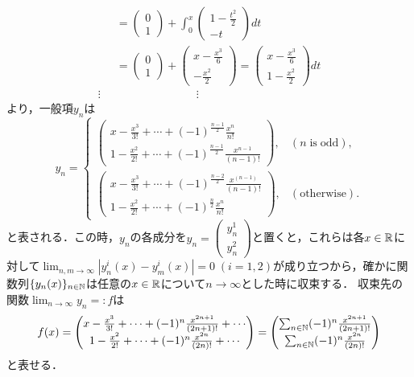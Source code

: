 \documentclass[uplatex,dvipdfmx]{jsarticle}
\begin{document}
\begin{align*}
    &= \begin{pmatrix}0\\1\end{pmatrix} + \int^x_0\begin{pmatrix}1-\frac{t^2}{2}\\-t\end{pmatrix}dt\\
    &= \begin{pmatrix}0\\1\end{pmatrix} + \begin{pmatrix}x-\frac{x^3}{6}\\-\frac{x^2}{2}\end{pmatrix} = \begin{pmatrix}x-\frac{x^3}{6}\\1-\frac{x^2}{2}\end{pmatrix}dt\\
    \vdots\;\;&\hspace{3cm}\vdots
\end{align*}
より，一般項$y_n$は
\[ y_n=\begin{cases}
    \begin{pmatrix}x-\frac{x^3}{3!}+\cdots+(-1)^{\frac{n-1}{2}}\frac{x^n}{n!}\\1-\frac{x^2}{2!}+\cdots+(-1)^{\frac{n-1}{2}}\frac{x^{n-1}}{(n-1)!}\end{pmatrix},&(n\;\mathrm{is\;odd}),\\
    \begin{pmatrix}x-\frac{x^3}{3!}+\cdots+(-1)^{\frac{n-2}{2}}\frac{x^{(n-1)}}{(n-1)!}\\1-\frac{x^2}{2!}+\cdots+(-1)^{\frac{n}{2}}\frac{x^{n}}{n!}\end{pmatrix},&(\mathrm{otherwise}).
\end{cases} \]
と表される．この時，$y_n$の各成分を$y_n=\begin{pmatrix}y_n^1\\y_n^2\end{pmatrix}$と置くと，これらは各$x\in\mathbb{R}$に対して$\lim_{n,m\to\infty}|y^i_n(x)-y^i_m(x)|=0\;(i=1,2)$が成り立つから，確かに関数列$\{y_n(x)\}_{n\in\mathbb{N}}$は任意の$x\in\mathbb{R}$について$n\to\infty$とした時に収束する．
収束先の関数$\lim_{n\to\infty}y_n=:f$は
\[ f(x)= \begin{pmatrix}x-\frac{x^3}{3!}+\cdots+(-1)^{n}\frac{x^{2n+1}}{(2n+1)!}+\cdots\\1-\frac{x^2}{2!}+\cdots+(-1)^{n}\frac{x^{2n}}{(2n)!}+\cdots\end{pmatrix} = \begin{pmatrix}\sum_{n\in\mathbb{N}}(-1)^{n}\frac{x^{2n+1}}{(2n+1)!}\\\sum_{n\in\mathbb{N}}(-1)^{n}\frac{x^{2n}}{(2n)!}\end{pmatrix}  \]
と表せる．
\end{document}
